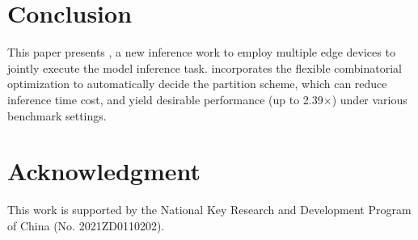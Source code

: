 \section{Conclusion}
\label{sec-conc}
This paper presents \sysname, a new inference work to employ multiple edge devices to jointly execute the model inference task. \sysname incorporates the flexible combinatorial optimization to automatically decide the partition scheme, which can reduce inference time cost, and yield desirable performance (up to 2.39$\times$) under various benchmark settings. 

\section{Acknowledgment}
This work is supported by the National Key Research and Development Program of China (No. 2021ZD0110202).